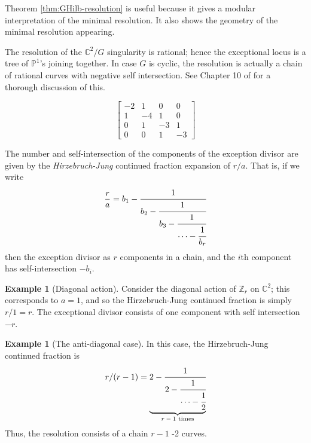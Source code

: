 \documentclass{amsart}[12pt]
\theoremstyle{definition}
\newtheorem{example}[dummy]{Example}
\newcommand{\Z}{\mathbb{Z}}
\newcommand{\C}{\mathbb{C}}
\newcommand{\proj}{\mathbb{P}}
\begin{document}
Theorem \ref{thm:GHilb-resolution} is useful because it gives a modular interpretation of the minimal resolution.  It also shows the geometry of the minimal resolution appearing.

The resolution of the $\C^2/G$ singularity is rational; hence the exceptional locus is a tree of $\proj^1$'s joining together.  In case $G$ is cyclic, the resolution is actually a chain of rational curves with negative self intersection.  See Chapter 10 of \cite{toric} for a thorough discussion of this.

\begin{center}
\end{center}

$$
\begin{bmatrix}
-2 & 1 & 0 & 0 \\
1 & -4 & 1 & 0 \\
0 & 1 & -3 & 1 \\
0 & 0 & 1 & -3 
\end{bmatrix}
$$

The number and self-intersection of the components of the exception divisor are given by the \emph{Hirzebruch-Jung} continued fraction expansion of $r/a$.  That is, if we write
$$
\frac{r}{a}=b_1-\cfrac{1}{b_2-\cfrac{1}{b_3-\cfrac{1}{\cdots - \cfrac{1}{b_r}}}}
$$  
then the exception divisor as $r$ components in a chain, and the $i$th component has self-intersection $-b_i$. 

\begin{example}[Diagonal action]
Consider the diagonal action of $\Z_r$ on $\C^2$; this corresponds to $a=1$, and so the Hirzebruch-Jung continued fraction is simply $r/1=r$.  The exceptional divisor consists of one component with self intersection $-r$.

\end{example}


\begin{example}[The anti-diagonal case]  
In this case, the Hirzebruch-Jung continued fraction is
$$r/(r-1)=\underbrace{2-\cfrac{1}{2-\cfrac{1}{\cdots-\cfrac{1}{2}}}}_{\text{$r-1$ times}}$$
Thus, the resolution consists of a chain $r-1$ -2 curves.
\end{example}
\end{document}
